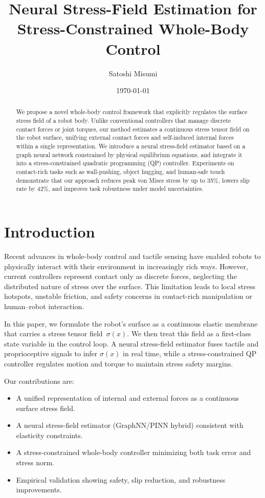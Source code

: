 \documentclass[titlepage]{ltjsarticle}
\title{Neural Stress-Field Estimation for Stress-Constrained Whole-Body Control}
\author{Satoshi Misumi}
\date{\today}
\begin{document}
\maketitle

\maketitle
\begin{abstract}
We propose a novel whole-body control framework that explicitly regulates the surface stress field of a robot body.
Unlike conventional controllers that manage discrete contact forces or joint torques, our method estimates a continuous stress tensor field on the robot surface, unifying external contact forces and self-induced internal forces within a single representation.
We introduce a neural stress-field estimator based on a graph neural network constrained by physical equilibrium equations, and integrate it into a stress-constrained quadratic programming (QP) controller.
Experiments on contact-rich tasks such as wall-pushing, object hugging, and human-safe touch demonstrate that our approach reduces peak von Mises stress by up to 35\%, lowers slip rate by 42\%, and improves task robustness under model uncertainties.
\end{abstract}

\section{Introduction}
Recent advances in whole-body control and tactile sensing have enabled robots to physically interact with their environment in increasingly rich ways.
However, current controllers represent contact only as discrete forces, neglecting the distributed nature of stress over the surface.
This limitation leads to local stress hotspots, unstable friction, and safety concerns in contact-rich manipulation or human–robot interaction.

In this paper, we formulate the robot’s surface as a continuous elastic membrane that carries a stress tensor field~$\sigma(x)$.
We then treat this field as a first-class state variable in the control loop.
A neural stress-field estimator fuses tactile and proprioceptive signals to infer $\sigma(x)$ in real time, while a stress-constrained QP controller regulates motion and torque to maintain stress safety margins.

Our contributions are:
\begin{itemize}
    \item A unified representation of internal and external forces as a continuous surface stress field.
    \item A neural stress-field estimator (GraphNN/PINN hybrid) consistent with elasticity constraints.
    \item A stress-constrained whole-body controller minimizing both task error and stress norm.
    \item Empirical validation showing safety, slip reduction, and robustness improvements.
\end{itemize}
\end{document}
